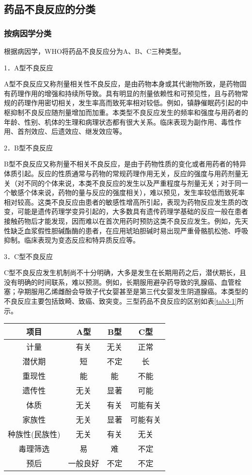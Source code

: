 \subsection{药品不良反应的分类}

\subsubsection{按病因学分类}

根据病因学，WHO将药品不良反应分为A、B、C三种类型。

1．A型不良反应

A型不良反应又称剂量相关性不良反应，是由药物本身或其代谢物所致，是药物固有药理作用的增强和持续所导致。具有明显的剂量依赖性和可预见性，且与药物常规的药理作用密切相关，发生率高而致死率相对较低。例如，镇静催眠药引起的中枢抑制不良反应随剂量增加而加重。本类型不良反应发生的频率和强度与用药者的年龄、性别、机体的生理和病理状态都有很大关系。临床表现为副作用、毒性作用、首剂效应、后遗效应、继发效应等。

2．B型不良反应

B型不良反应又称剂量不相关不良反应，是由于药物性质的变化或者用药者的特异体质引起。反应的性质通常与药物的常规药理作用无关，反应的强度与用药剂量无关（对不同的个体来说，本类不良反应的发生以及严重程度与剂量无关；对于同一个敏感个体来说，药物的量与反应的强度相关），难以预见，发生率较低而致死率相对较高。这类不良反应由患者的敏感性增高所引起，表现为药物反应发生质的改变，可能是遗传药理学变异引起的，大多数具有遗传药理学基础的反应一般在患者接触药物后才能发现，因而难以在首次用药时预防这类不良反应发生。例如，先天性缺乏血浆假性胆碱酯酶的患者，在应用琥珀胆碱时易出现严重骨骼肌松弛、呼吸抑制。临床表现为变态反应和特异质反应等。

3．C型不良反应

C型不良反应发生机制尚不十分明确，大多是发生在长期用药之后，潜伏期长，且没有明确的时间联系，难以预测。例如，长期服用避孕药导致的乳腺癌、血管栓塞；孕期服用乙烯雌酚会导致子代女婴甚至是第三代女婴发生阴道腺癌。本类型的不良反应主要包括致畸、致癌、致突变。三型药品不良反应的区别如表\ref{tab3-1}所示。

\begin{table}[ht]
    \caption{三型药品不良反应的区别}
    \label{tab3-1}
    \centering
    \begin{longtable}{cccc}
    \toprule
    项目 & A型 & B型 & C型 \\
    \midrule
    计量 & 有关 & 无关 & 正常\\
    潜伏期 & 短 & 不定 & 长 \\
    重现性 & 能 & 能 & 不能\\
    遗传性 & 无关 & 显著 & 可能\\
    体质 & 无关 & 有关 & 可能有关\\
    家族性 & 无关 & 显著 & 可能有关\\
    种族性(民族性) & 无关 & 有关 & 无关\\
    毒理筛选 & 易 & 难 & 不定\\
    预后 & 一般良好 & 不定 & 不定\\
    \bottomrule
    \end{longtable}
\end{table}


